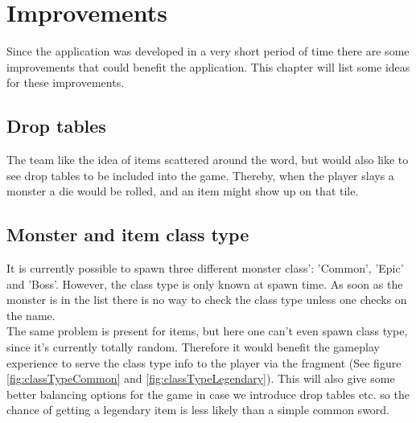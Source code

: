 \pagestyle{Uni}

\chapter{Improvements}

Since the application was developed in a very short period of time there are some improvements that could benefit the application. This chapter will list some ideas for these improvements.

\section{Drop tables}
The team like the idea of items scattered around the word, but would also like to see drop tables to be included into the game. Thereby, when the player slays a monster a die would be rolled, and an item might show up on that tile. 

\section{Monster and item class type}
It is currently possible to spawn three different monster class': 'Common', 'Epic' and 'Boss'. However, the class type is only known at spawn time. As soon as the monster is in the list there is no way to check the class type unless one checks on the name. \\
The same problem is present for items, but here one can't even spawn class type, since it's currently totally random. Therefore it would benefit the gameplay experience to serve the class type info to the player via the fragment (See figure \ref{fig:classTypeCommon} and \ref{fig:classTypeLegendary}). This will also give some better balancing options for the game in case we introduce drop tables etc. so the chance of getting a legendary item is less likely than a simple common sword.

